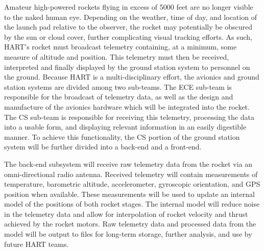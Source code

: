\documentclass[journal,10pt,onecolumn,compsoc]{IEEEtran}
\begin{document}

	\noindent Amateur high-powered rockets flying in excess of 5000 feet are no longer visible to the naked human eye. 
	Depending on the weather, time of day, and location of the launch pad relative to the observer, the rocket may potentially be obscured by the sun or cloud cover, further complicating visual tracking efforts. 
	As such, HART's rocket must broadcast telemetry containing, at a minimum, some measure of altitude and position.
	This telemetry must then be received, interpreted and finally displayed by the ground station system to personnel on the ground.
	Because HART is a multi-disciplinary effort, the avionics and ground station systems are divided among two sub-teams.
	The ECE sub-team is responsible for the broadcast of telemetry data, as well as the design and manufacture of the avionics hardware which will be integrated into the rocket.
	The CS sub-team is responsible for receiving this telemetry, processing the data into a usable form, and displaying relevant information in an easily digestible manner.
	To achieve this functionality, the CS portion of the ground station system will be further divided into a back-end and a front-end.
	
	\noindent The back-end subsystem will receive raw telemetry data from the rocket via an omni-directional radio antenna.
	Received telemetry will contain measurements of temperature, barometric altitude, accelerometer, gyroscopic orientation, and GPS position when available.
	These measurements will be used to update an internal model of the positions of both rocket stages.
	The internal model will reduce noise in the telemetry data and allow for interpolation of rocket velocity and thrust achieved by the rocket motors.
	Raw telemetry data and processed data from the model will be output to files for long-term storage, further analysis, and use by future HART teams.
	
\end{document}
